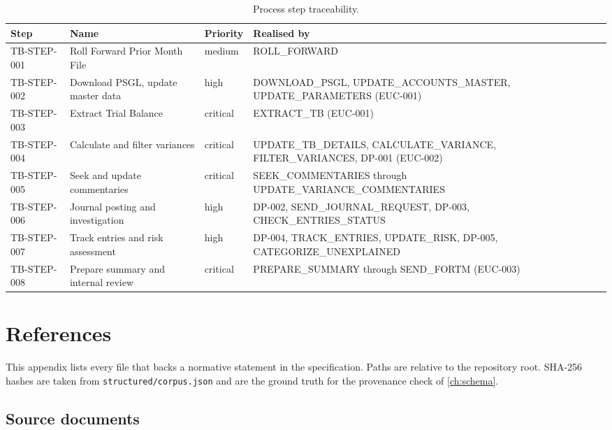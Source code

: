 \documentclass[11pt,a4paper,twoside]{report}
\newcommand{\corpus}{}
\begin{document}
\begin{table}[htbp]
\caption{Process step traceability.}\label{tab:traceability}
\centering
\footnotesize
\begin{tabularx}{\linewidth}{@{}p{2.1cm}p{3.9cm}lX@{}}
\toprule
\textbf{Step} & \textbf{Name} & \textbf{Priority} & \textbf{Realised by} \\ \midrule
TB-STEP-001 & Roll Forward Prior Month File        & medium   & ROLL\_FORWARD \\
TB-STEP-002 & Download PSGL, update master data    & high     & DOWNLOAD\_PSGL, UPDATE\_ACCOUNTS\_MASTER, UPDATE\_PARAMETERS (EUC-001) \\
TB-STEP-003 & Extract Trial Balance                & critical & EXTRACT\_TB (EUC-001) \\
TB-STEP-004 & Calculate and filter variances       & critical & UPDATE\_TB\_DETAILS, CALCULATE\_VARIANCE, FILTER\_VARIANCES, DP-001 (EUC-002) \\
TB-STEP-005 & Seek and update commentaries         & critical & SEEK\_COMMENTARIES through UPDATE\_VARIANCE\_COMMENTARIES \\
TB-STEP-006 & Journal posting and investigation    & high     & DP-002, SEND\_JOURNAL\_REQUEST, DP-003, CHECK\_ENTRIES\_STATUS \\
TB-STEP-007 & Track entries and risk assessment    & high     & DP-004, TRACK\_ENTRIES, UPDATE\_RISK, DP-005, CATEGORIZE\_UNEXPLAINED \\
TB-STEP-008 & Prepare summary and internal review  & critical & PREPARE\_SUMMARY through SEND\_FORTM (EUC-003) \\
\bottomrule
\end{tabularx}
\end{table}
\chapter{References}\label{ch:references}

This appendix lists every file that backs a normative statement in the
specification. Paths are relative to the repository root. SHA-256
hashes are taken from \corpus\texttt{structured/corpus.json} and are
the ground truth for the provenance check of \cref{ch:schema}.

\section{Source documents}
\end{document}
